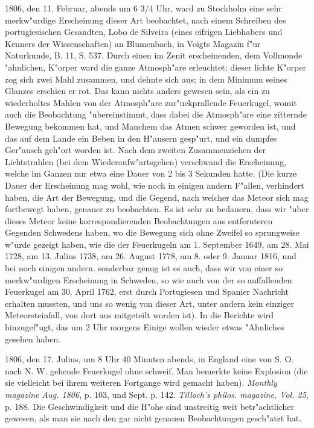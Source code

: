 \documentclass[a4paper, 11pt, oneside, polutonikogreek, german]{article}
\begin{document}
1806, den 11. Februar, abends um 6 3/4 Uhr, ward zu Stockholm eine sehr merkw"urdige Erscheinung dieser Art beobachtet, nach einem Schreiben des portugiesischen Gesandten, Lobo de Silveira (eines eifrigen Liebhabers und Kenners der Wissenschaften) an Blumenbach, in Voigts Magazin f"ur Naturkunde, B. 11, S. 537. Durch einen im Zenit erscheinenden, dem Vollmonde "ahnlichen, K"orper ward die ganze Atmosph"are erleuchtet; dieser lichte K"orper zog sich zwei Mahl zusammen, und dehnte sich aus; in dem Minimum seines Glanzes erschien er rot. Das kann nichts anders gewesen sein, als ein zu wiederholtes Mahlen von der Atmosph"are zur"uckprallende Feuerkugel, womit auch die Beobachtung "ubereinstimmt, dass dabei die Atmosph"are eine zitternde Bewegung bekommen hat, und Manchem das Atmen schwer geworden ist, und das auf dem Lande ein Beben in den H"ausern gesp"urt, und ein dumpfes Ger"ausch geh"ort worden ist. Nach dem zweiten Zusammenziehen der Lichtstrahlen (bei dem Wiederaufw"artsgehen) verschwand die Erscheinung, welche im Ganzen nur etwa eine Dauer von 2 bis 3 Sekunden hatte. (Die kurze Dauer der Erscheinung mag wohl, wie noch in einigen andern F"allen, verhindert haben, die Art der Bewegung, und die Gegend, nach welcher das Meteor sich mag fortbewegt haben, genauer zu beobachten. Es ist sehr zu bedauern, dass wir "uber dieses Meteor keine korrespondierenden Beobachtungen aus entfernteren Gegenden Schwedens haben, wo die Bewegung sich ohne Zweifel so sprungweise w"urde gezeigt haben, wie die der Feuerkugeln am 1. September 1649, am 28. Mai 1728, am 13. Julius 1738, am 26. August 1778, am 8. oder 9. Januar 1816, und bei noch einigen andern. sonderbar genug ist es auch, dass wir von einer so merkw"urdigen Erscheinung in Schweden, so wie auch von der so auffallenden Feuerkugel am 30. April 1762, erst durch Portugiesen und Spanier Nachricht erhalten mussten, und uns so wenig von dieser Art, unter andern kein einziger Meteorsteinfall, von dort aus mitgeteilt worden ist). In die Berichte wird hinzugef"ugt, das um 2 Uhr morgens Einige wollen wieder etwas "Ahnliches gesehen haben.

1806, den 17. Julius, um 8 Uhr 40 Minuten abends, in England eine von S. O. nach N. W. gehende Feuerkugel ohne schweif. Man bemerkte keine Explosion (die sie vielleicht bei ihrem weiteren Fortgange wird gemacht haben). \emph{Monthly magazine Aug. 1806}, p. 103, und Sept. p. 142. \emph{Tilloch's philos. magazine, Vol. 25}, p. 188. Die Geschwindigkeit und die H"ohe sind unstreitig weit betr"achtlicher gewesen, als man sie nach den gar nicht genauen Beobachtungen gesch"atzt hat.
\end{document}
